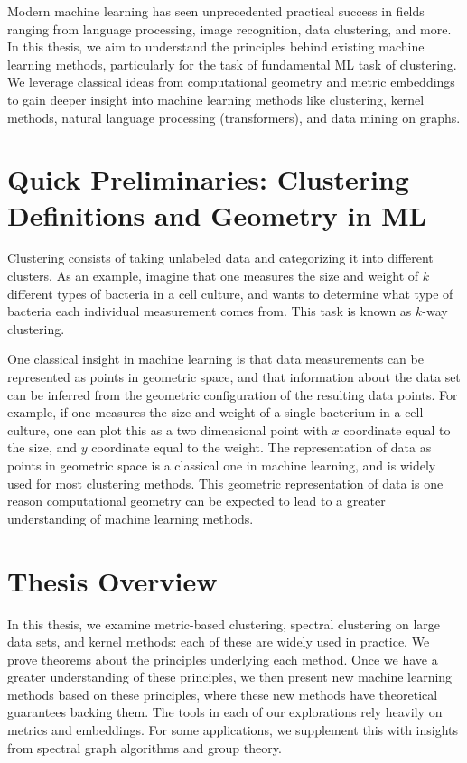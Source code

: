 Modern machine learning has seen unprecedented practical success in fields ranging
from language processing, image recognition, data clustering, and more.
In this thesis, we aim to understand the principles behind existing
machine learning methods, particularly for the task of fundamental ML
task of clustering. We
leverage classical ideas from computational geometry and metric embeddings to gain deeper
insight into machine learning methods like clustering, kernel methods,
        natural language processing (transformers), and data mining on
        graphs.

\setcounter{section}{-1}
\section{Quick Preliminaries: Clustering Definitions and Geometry in ML}

Clustering consists of taking unlabeled data and categorizing it into different
clusters. As an example, imagine that one measures the size and weight
of
$k$ different types of bacteria in a cell culture, and wants to determine
what type of bacteria each individual measurement comes from.  This task
is known as $k$-way clustering. 

One classical insight in machine learning is that data measurements can
be represented as points in geometric space, and that information about
the data set can be inferred from the geometric configuration of the
resulting data points. For example, if one measures the size and weight
of a single bacterium in a cell culture, one can plot this as a two
dimensional point with $x$ coordinate equal to the size, and $y$
coordinate equal to the weight. The representation of data as points in
geometric space is a classical one in machine learning, and is widely
used for most clustering methods. This geometric
representation of data is one reason computational geometry can be expected to
lead to a greater understanding of machine learning methods.


\section{Thesis Overview}

In this thesis, we examine metric-based clustering, spectral clustering
on large data sets, and kernel methods: each of these are widely used in
practice. We prove theorems about the principles underlying each method.
Once we have a greater understanding of these principles, we then
present new machine learning methods based on these principles, where
these new methods have theoretical guarantees backing them.
The tools in each of our explorations rely heavily on metrics and
embeddings.  For some applications, we supplement this with insights
from spectral graph algorithms and group theory.

